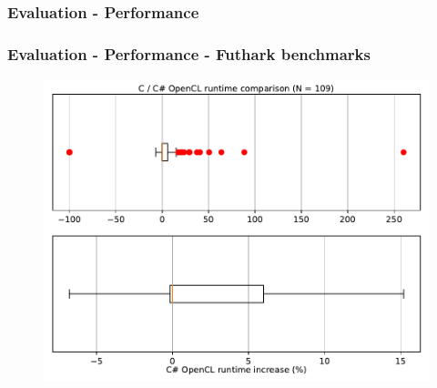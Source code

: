 \documentclass[10pt, compress, usenames, dvipsnames]{beamer}
\begin{document}
\begin{frame}[fragile]
  \frametitle{Evaluation - Performance}




\end{frame}
\begin{frame}[fragile]
  \frametitle{Evaluation - Performance - Futhark benchmarks}
  \begin{figure}
  \includegraphics[scale=0.6]{./images/boxplot}
  \end{figure}
\end{frame}
\end{document}
